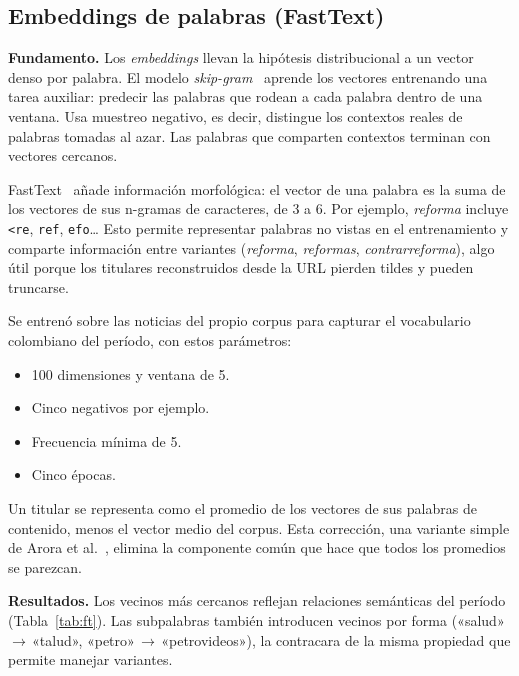 \documentclass[10pt,twocolumn]{article}
\begin{document}
\subsection{Embeddings de palabras (FastText)}

\textbf{Fundamento.} Los \emph{embeddings} llevan la hipótesis distribucional a
un vector denso por palabra. El modelo \textit{skip-gram}~\cite{mikolov2013}
aprende los vectores entrenando una tarea auxiliar: predecir las palabras que
rodean a cada palabra dentro de una ventana. Usa muestreo negativo, es decir,
distingue los contextos reales de palabras tomadas al azar. Las palabras que
comparten contextos terminan con vectores cercanos.

FastText~\cite{bojanowski2017} añade información morfológica: el vector de una
palabra es la suma de los vectores de sus n-gramas de caracteres, de 3 a 6.
Por ejemplo, \textit{reforma} incluye \texttt{<re}, \texttt{ref},
\texttt{efo}… Esto permite representar palabras no vistas en el entrenamiento
y comparte información entre variantes (\textit{reforma}, \textit{reformas},
\textit{contrarreforma}), algo útil porque los titulares reconstruidos desde la
URL pierden tildes y pueden truncarse.

Se entrenó sobre las noticias del propio corpus para capturar el vocabulario
colombiano del período, con estos parámetros:

\begin{itemize}
\item 100 dimensiones y ventana de 5.
\item Cinco negativos por ejemplo.
\item Frecuencia mínima de 5.
\item Cinco épocas.
\end{itemize}

Un titular se representa como el promedio de los vectores de sus palabras de
contenido, menos el vector medio del corpus. Esta corrección, una variante
simple de Arora et al.~\cite{arora2017}, elimina la componente común que hace
que todos los promedios se parezcan.

\textbf{Resultados.} Los vecinos más cercanos reflejan relaciones semánticas del
período (Tabla~\ref{tab:ft}). Las subpalabras también introducen vecinos por
forma («salud»\,$\to$\,«talud», «petro»\,$\to$\,«petrovideos»), la contracara de
la misma propiedad que permite manejar variantes.
\end{document}
